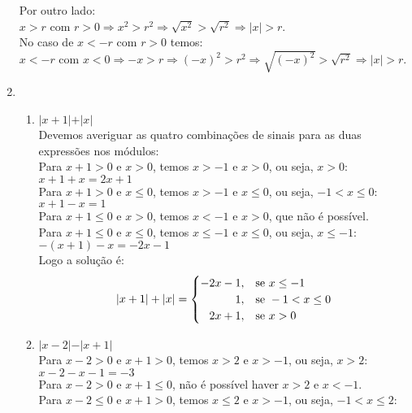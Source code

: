 \documentclass[10pt]{book}
\begin{document}
\begin{enumerate}
		Por outro lado:\\
		$x > r$ com $r > 0 \Rightarrow x^2 > r^2 \Rightarrow \sqrt{x^2} > \sqrt{r^2} \Rightarrow \vert x \vert > r$.\\
		No caso de $x < -r$ com $r > 0$ temos:\\
		$x < -r$ com $x < 0 \Rightarrow -x > r \Rightarrow (-x)^2 > r^2\Rightarrow \sqrt{(-x)^2} > \sqrt{r^2} \Rightarrow \vert x \vert > r$.
	\item %
		\begin{enumerate}
			\item %
			$\vert x + 1 \vert + \vert x \vert$\\
			Devemos averiguar as quatro combinações de sinais para as duas expressões nos módulos:\\
			Para $x + 1 > 0$ e $x > 0$, temos $x > -1$ e $x > 0$, ou seja, $x > 0$:\\
			$x + 1 + x = 2x + 1$\\
			Para $x + 1 > 0$ e $x \leq 0$, temos $x > -1$ e $x \leq 0$, ou seja, $-1 < x \leq 0$:\\
			$x + 1 - x = 1$\\
			Para $x + 1 \leq 0$ e $x > 0$, temos $x < -1$ e $x > 0$, que não é possível.\\
			Para $x + 1 \leq 0$ e $x \leq 0$, temos $x \leq -1$ e $x \leq 0$, ou seja, $x \leq -1$:\\		
			$-(x + 1) -x = -2x - 1$\\
			Logo a solução é:\\
			\begin{equation*}
		    	\vert x + 1 \vert + \vert x \vert =
			    \begin{cases}
			      -2x - 1, & \text{se}\ x \leq -1 \\
			      \hfill 1, & \text{se}\ -1 < x \leq 0 \\
			      \hfill 2x + 1, & \text{se}\ x > 0 
		    	\end{cases}
			\end{equation*}
			\item %
			$\vert x - 2\vert - \vert x + 1 \vert$\\
			Para $x - 2 > 0$ e $x + 1 > 0$, temos $x > 2$ e $x > -1$, ou seja, $x > 2$:\\
			$x - 2 - x - 1 = -3$\\
			Para $x - 2 > 0$ e $x + 1 \leq 0$, não é possível haver $x > 2$ e $ x < -1$.\\
			Para $x - 2 \leq 0$ e $x + 1 > 0$, temos $x \leq 2$ e $x > -1$, ou seja, $-1 < x \leq 2$:\\

\end{enumerate}
\end{enumerate}
\end{document}
